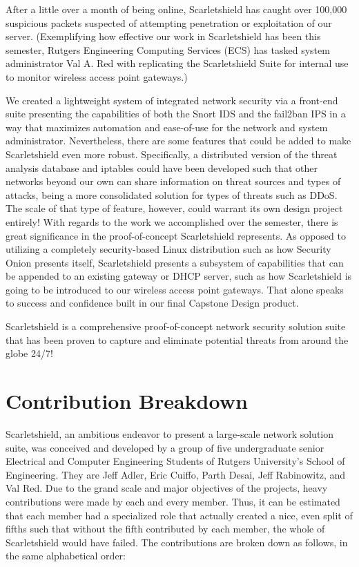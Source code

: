 \documentclass[12pt,letterpaper,titlepage]{report}
\begin{document}
{After a little over a month of being online, Scarletshield has caught over 100,000 
suspicious packets suspected of attempting penetration or exploitation of our server.
(Exemplifying how effective our work in Scarletshield has been this semester, 
Rutgers Engineering Computing Services (ECS) has tasked system administrator 
Val A. Red with replicating the Scarletshield Suite for internal use to monitor 
wireless access point gateways.)

We created a lightweight system of integrated network security via a front-end suite 
presenting the capabilities of both the Snort IDS and the fail2ban IPS in a way that
maximizes automation and ease-of-use for the network and system administrator.  
Nevertheless, there are some features that could be added to make Scarletshield even more robust.  
Specifically, a distributed version of the threat analysis database and iptables could have 
been developed such that other networks beyond our own can share information on threat sources 
and types of attacks, being a more consolidated solution for types of threats such as DDoS. 
The scale of that type of feature, however, could warrant its own design project entirely!  
With regards to the work we accomplished over the semester, there is great significance in the
proof-of-concept Scarletshield represents. As opposed to utilizing a completely security-based
Linux distribution such as how Security Onion presents itself, Scarletshield presents a subsystem
of capabilities that can be appended to an existing gateway or DHCP server, such as how
Scarletshield is going to be introduced to our wireless access point gateways.  
That alone speaks to success and confidence built in our final Capstone Design product.

Scarletshield is a comprehensive proof-of-concept network security solution suite that has 
been proven to capture and eliminate potential threats from around the globe 24/7! 

\section{Contribution Breakdown}

Scarletshield, an ambitious endeavor to present a large-scale network solution
suite,  was conceived and developed by a group of five undergraduate senior
Electrical and Computer Engineering Students of Rutgers University’s School of
Engineering.  They are Jeff Adler, Eric Cuiffo, Parth Desai, Jeff Rabinowitz,
and Val Red.  Due to the grand scale and major objectives of the projects, heavy
contributions were made by each and every member. Thus, it can be estimated that
each member had a specialized role that actually created a nice, even split of
fifths such that without the fifth contributed by each member, the whole of
Scarletshield would have failed. The contributions are broken down as follows,
in the same alphabetical order:

}
\end{document}
